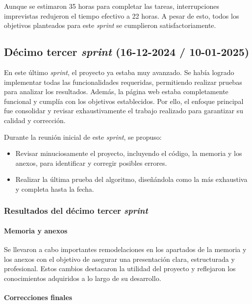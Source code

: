 Aunque se estimaron 35 horas para completar las tareas, interrupciones imprevistas redujeron el tiempo efectivo a 22 horas. A pesar de esto, todos los objetivos planteados para este \textit{sprint} se cumplieron satisfactoriamente.

\subsection{Décimo tercer \textit{sprint} (16-12-2024 / 10-01-2025)}

En este último \textit{sprint}, el proyecto ya estaba muy avanzado. Se había logrado implementar todas las funcionalidades requeridas, permitiendo realizar pruebas para analizar los resultados. Además, la página web estaba completamente funcional y cumplía con los objetivos establecidos. Por ello, el enfoque principal fue consolidar y revisar exhaustivamente el trabajo realizado para garantizar su calidad y corrección.

Durante la reunión inicial de este \textit{sprint}, se propuso:

\begin{itemize}
    \item Revisar minuciosamente el proyecto, incluyendo el código, la memoria y los anexos, para identificar y corregir posibles errores.
    \item Realizar la última prueba del algoritmo, diseñándola como la más exhaustiva y completa hasta la fecha.
\end{itemize}

\subsubsection{Resultados del décimo tercer \textit{sprint}}

\paragraph{Memoria y anexos}

Se llevaron a cabo importantes remodelaciones en los apartados de la memoria y los anexos con el objetivo de asegurar una presentación clara, estructurada y profesional. Estos cambios destacaron la utilidad del proyecto y reflejaron los conocimientos adquiridos a lo largo de su desarrollo.

\paragraph{Correcciones finales}

